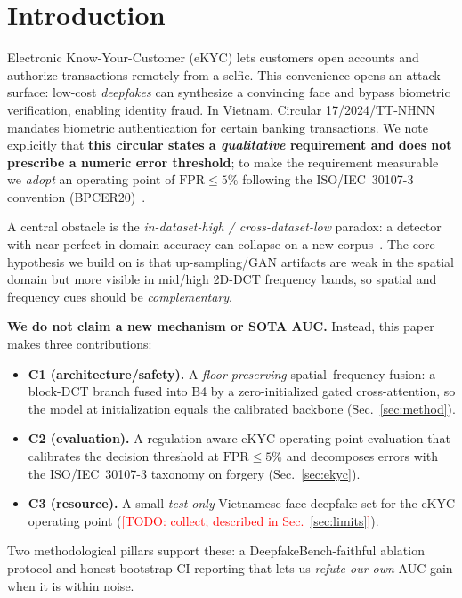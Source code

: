 \documentclass[conference]{IEEEtran}
\newcommand{\todo}[1]{\textcolor{red}{[TODO: #1]}}
\begin{document}
\section{Introduction}
Electronic Know-Your-Customer (eKYC) lets customers open accounts and authorize transactions
remotely from a selfie. This convenience opens an attack surface: low-cost \emph{deepfakes} can
synthesize a convincing face and bypass biometric verification, enabling identity fraud. In Vietnam,
Circular 17/2024/TT-NHNN mandates biometric authentication for certain banking transactions. We note
explicitly that \textbf{this circular states a \emph{qualitative} requirement and does not prescribe a
numeric error threshold}; to make the requirement measurable we \emph{adopt} an operating point of
$\text{FPR}\le 5\%$ following the ISO/IEC~30107-3 convention (BPCER20)~\cite{iso30107,tt17_2024}.

A central obstacle is the \emph{in-dataset-high / cross-dataset-low} paradox: a detector with near-perfect
in-domain accuracy can collapse on a new corpus~\cite{yan2023deepfakebench}. The core hypothesis we
build on is that up-sampling/GAN artifacts are weak in the spatial domain but more visible in
mid/high 2D-DCT frequency bands, so spatial and frequency cues should be \emph{complementary}.

\textbf{We do not claim a new mechanism or SOTA AUC.} Instead, this paper makes three contributions:
\begin{itemize}
  \item \textbf{C1 (architecture/safety).} A \emph{floor-preserving} spatial--frequency fusion:
  a block-DCT branch fused into B4 by a zero-initialized gated cross-attention, so the model at
  initialization equals the calibrated backbone (Sec.~\ref{sec:method}).
  \item \textbf{C2 (evaluation).} A regulation-aware eKYC operating-point evaluation that calibrates
  the decision threshold at $\text{FPR}\le 5\%$ and decomposes errors with the ISO/IEC~30107-3
  taxonomy on forgery (Sec.~\ref{sec:ekyc}).
  \item \textbf{C3 (resource).} A small \emph{test-only} Vietnamese-face deepfake set for the eKYC
  operating point (\todo{collect; described in Sec.~\ref{sec:limits}}).
\end{itemize}
Two methodological pillars support these: a DeepfakeBench-faithful ablation protocol and honest
bootstrap-CI reporting that lets us \emph{refute our own} AUC gain when it is within noise.
\end{document}
